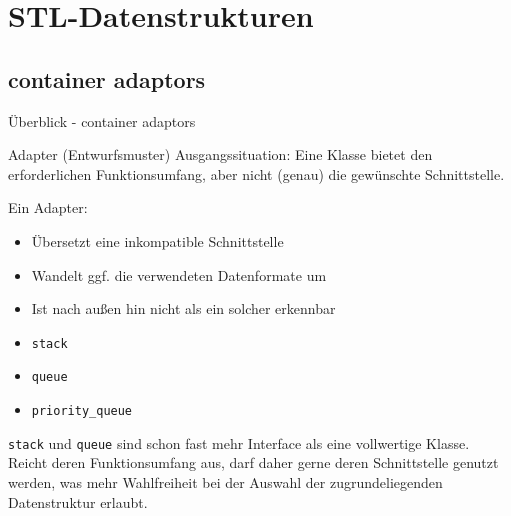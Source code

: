 \section{STL-Datenstrukturen}

\subsection{container adaptors}

\begin{frame}{Überblick - container adaptors}
 	\begin{block}{Adapter (Entwurfsmuster)}
	 	\pause
	 	Ausgangssituation: Eine Klasse bietet den erforderlichen Funktionsumfang, aber nicht (genau) die gewünschte Schnittstelle.
	 	
	 	\pause
	 	
	 	Ein Adapter:
	 	\begin{itemize}
	 		\item Übersetzt eine inkompatible Schnittstelle
	 		\item Wandelt ggf. die verwendeten Datenformate um
	 		\item Ist nach außen hin nicht als ein solcher erkennbar
	 	\end{itemize}
 	\end{block}
 	
 	\pause
 	
	\begin{itemize}
		\item \texttt{stack}
		\item \texttt{queue}
		\item \texttt{priority\_queue}
	\end{itemize}
	
	\pause
	
	\texttt{stack} und \texttt{queue} sind schon fast mehr Interface als eine vollwertige Klasse. Reicht deren Funktionsumfang aus, darf daher gerne deren Schnittstelle genutzt werden, was mehr Wahlfreiheit bei der Auswahl der zugrundeliegenden Datenstruktur erlaubt.
\end{frame}

